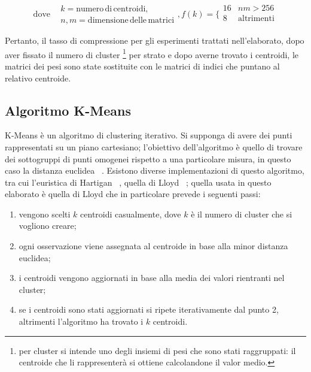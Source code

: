 \documentclass[12pt]{report}
\begin{document}
$$\mathrm{dove}\,\,\,\,\,
\begin{array}{ll}
k = \mathrm{numero\, di\, centroidi}, \\
n, m = \mathrm{dimensione\, delle\, matrici}
\end{array},
f(k) =
\bigg \{
\begin{array}{rl}
16 & nm > 256 \\
8 & \mathrm{altrimenti} \\
\end{array}
$$

\null\par\null

Pertanto, il tasso di compressione per gli esperimenti trattati nell'elaborato, dopo aver fissato il numero di cluster \footnote{per cluster si intende uno degli insiemi di pesi che sono stati raggruppati: il centroide che li rappresenterà si ottiene calcolandone il valor medio.} per strato e dopo averne trovato i centroidi, le matrici dei pesi sono state sostituite con le matrici di indici che puntano al relativo centroide.

\newpage

\subsection{Algoritmo K-Means}\label{kmeans}
K-Means è un algoritmo di clustering iterativo. Si supponga di avere dei punti rappresentati su un piano cartesiano; l'obiettivo dell'algoritmo è quello di trovare dei sottogruppi di punti omogenei rispetto a una particolare misura, in questo caso la distanza euclidea ~\cite{KMeansArticle}. Esistono diverse implementazioni di questo algoritmo, tra cui l'euristica di Hartigan ~\cite{Hartigan}, quella di Lloyd ~\cite{Lloyd}; quella usata in questo elaborato è quella di Lloyd che in particolare prevede i seguenti passi:

\begin{enumerate}
\item{vengono scelti $k$ centroidi casualmente, dove $k$ è il numero di cluster che si vogliono creare};
\item{ogni osservazione viene assegnata al centroide in base alla minor distanza euclidea};
\item{i centroidi vengono aggiornati in base alla media dei valori rientranti nel cluster};
\item{se i centroidi sono stati aggiornati si ripete iterativamente dal punto 2, altrimenti l’algoritmo ha trovato i $k$ centroidi}.
\end{enumerate}
\end{document}

